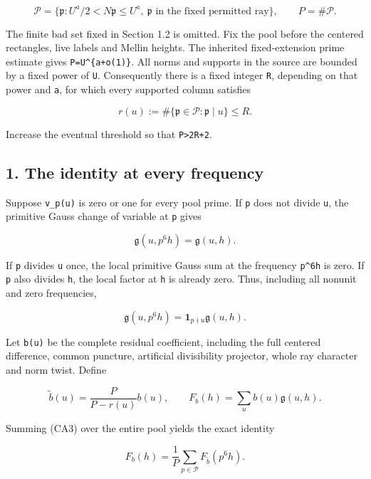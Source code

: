 \[
 \mathcal P=\{\mathfrak p:U^a/2<N\mathfrak p\le U^a,
                  \ \mathfrak p\text{ in the fixed permitted ray}\},
 \qquad P=\#\mathcal P.
\tag{CA1}
\]

The finite bad set fixed in Section 1.2 is omitted. Fix the pool before the centered rectangles, live labels and Mellin heights. The inherited fixed-extension prime estimate gives \texttt{P=U\^{}\{a+o(1)\}}. All norms and supports in the source are bounded by a fixed power of \texttt{U}. Consequently there is a fixed integer \texttt{R}, depending on that power and \texttt{a}, for which every supported column satisfies

\[
 r(u):=\#\{\mathfrak p\in\mathcal P:\mathfrak p\mid u\}\le R.
\tag{CA2}
\]

Increase the eventual threshold so that \texttt{P\textgreater{}2R+2}.

\hypertarget{sources:the-identity-at-every-frequency}{%
\subsection{1. The identity at every frequency}\label{sources:the-identity-at-every-frequency}}

Suppose \texttt{v\_\allowbreak{}p(u)} is zero or one for every pool prime. If \texttt{p} does not divide \texttt{u}, the primitive Gauss change of variable at \texttt{p} gives

\[
 \mathfrak g(u,p^6h)=\mathfrak g(u,h).
\]

If \texttt{p} divides \texttt{u} once, the local primitive Gauss sum at the frequency \texttt{p\^{}6h} is zero. If \texttt{p} also divides \texttt{h}, the local factor at \texttt{h} is already zero. Thus, including all nonunit and zero frequencies,

\[
 \mathfrak g(u,p^6h)
 =\mathbf1_{p\nmid u}\mathfrak g(u,h).
\tag{CA3}
\]

Let \texttt{b(u)} be the complete residual coefficient, including the full centered difference, common puncture, artificial divisibility projector, whole ray character and norm twist. Define

\[
 \widetilde b(u)=\frac{P}{P-r(u)}b(u),\qquad
 F_b(h)=\sum_u b(u)\mathfrak g(u,h).
\tag{CA4}
\]

Summing (CA3) over the entire pool yields the exact identity

\[
 \boxed{\quad F_b(h)=\frac1P
                  \sum_{p\in\mathcal P}F_{\widetilde b}(p^6h).
            \quad}
\tag{CA5}
\]

